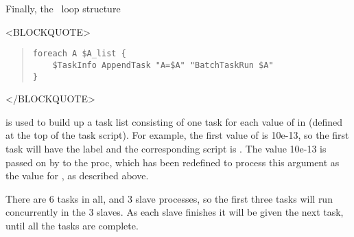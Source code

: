 Finally, the \Tcl\ loop structure
\begin{rawhtml}<BLOCKQUOTE>\end{rawhtml}
\begin{quote}
\begin{verbatim}
foreach A $A_list {
    $TaskInfo AppendTask "A=$A" "BatchTaskRun $A"
}
\end{verbatim}
\end{quote}
\begin{rawhtml}</BLOCKQUOTE>\end{rawhtml}
is used to build up a task list consisting of one task for each value
of  in  (defined at the top of the task script).  For
example, the first value of  is 10e-13, so the first task
will have the label  and the corresponding script is
.  The value 10e-13 is passed on by
 to the  proc, which has been
redefined to process this argument as the value for , as
described above.

There are 6 tasks in all, and 3 slave processes, so the first three
tasks will run concurrently in the 3 slaves.  As each slave finishes
it will be given the next task, until all the tasks are complete.

